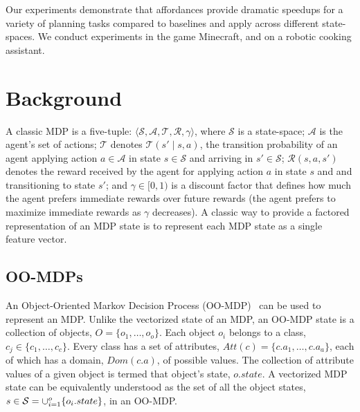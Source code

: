 \documentclass[conference]{IEEEtran}
\begin{document}

Our experiments demonstrate that affordances provide dramatic speedups for a variety
of planning tasks compared to baselines and apply across different state-spaces.  We 
conduct experiments in the game Minecraft, and on a robotic cooking assistant. 

\section{Background}
\label{sec:background}
A classic MDP is a five-tuple: $\langle \mathcal{S}, \mathcal{A}, \mathcal{T},
\mathcal{R}, \gamma \rangle$, where $\mathcal{S}$ is a state-space;
$\mathcal{A}$ is the agent's set of actions; $\mathcal{T}$ denotes
$\mathcal{T}(s' \mid s,a)$, the transition probability of an agent
applying action $a \in \mathcal{A}$ in state $s \in \mathcal{S}$ and
arriving in $s' \in \mathcal{S}$; $\mathcal{R}(s,a,s')$ denotes the
reward received by the agent for applying action $a$ in state $s$ and
and transitioning to state $s'$; and $\gamma \in [0, 1)$ is a discount
factor that defines how much the agent prefers immediate rewards
over future rewards (the agent prefers to maximize
immediate rewards as $\gamma$ decreases). A classic way to 
provide a factored representation of an MDP state is to represent
each MDP state as a single feature vector. 

\subsection{OO-MDPs}
An Object-Oriented Markov Decision Process (OO-MDP)~\citep{diuk08}
can be used to represent an MDP. Unlike the vectorized state of an MDP, 
an OO-MDP state is a collection of objects, $O = \{o_1, \ldots, o_o \}$. 
Each object $o_i$ belongs to a class, $c_j \in  \{c_1, \ldots, c_c\}$. Every
class has a set of attributes, $Att(c) = \{c.a_1, \ldots, c.a_a \}$, each of which
has a domain, $Dom(c.a)$, of possible values. The collection of attribute values
of a given object is termed that object's state, $o.state$. A vectorized MDP state
can be equivalently understood as the set of all the object states, 
$s \in {\cal S} = \cup_{i = 1}^o \{o_i.state\}$, in an OO-MDP. 
\end{document}
